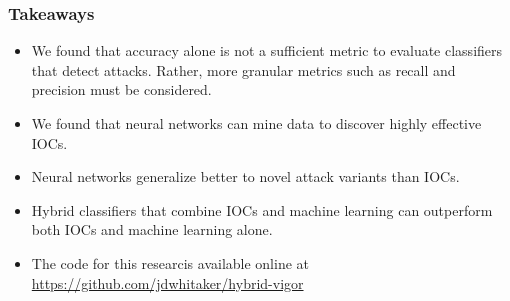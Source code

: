 \begin{frame}
\frametitle{Takeaways}
\begin{itemize}
  \item We found that accuracy alone is not a sufficient metric to evaluate classifiers that detect attacks. Rather, more granular metrics such as recall and precision must be considered.
  \item We found that neural networks can mine data to discover highly effective IOCs. 
  \item Neural networks generalize better to novel attack variants than IOCs.
  \item Hybrid classifiers that combine IOCs and machine learning can outperform both IOCs and machine learning alone.
  \item The code for this researcis available online at \url{https://github.com/jdwhitaker/hybrid-vigor}
\end{itemize}
\end{frame}